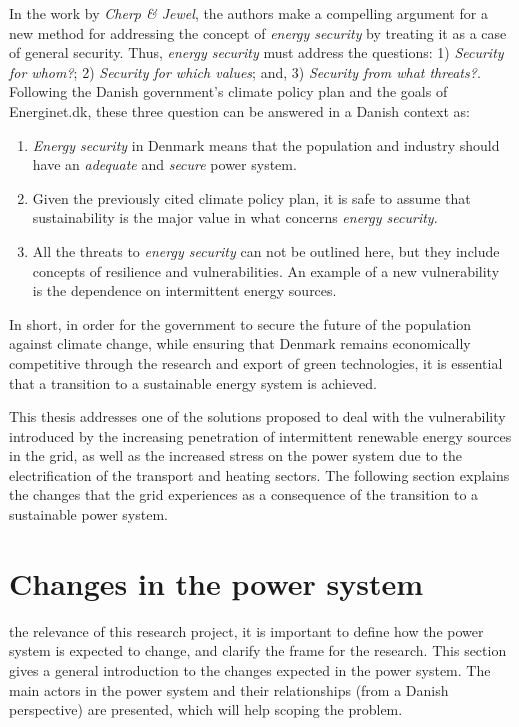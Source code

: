 In the work by \textit{Cherp \& Jewel}, the authors make a compelling argument for a new method for addressing the concept of \emph{energy security} by treating it as a case of general security. Thus, \emph{energy security} must address the questions: 1) \emph{Security for whom?}; 2) \emph{Security for which values}; and, 3) \emph{Security from what threats?}. Following the Danish government's climate policy plan and the goals of Energinet.dk, these three question can be answered in a Danish context as:
\begin{enumerate}
	\item \emph{Energy security} in Denmark means that the population and industry should have an \emph{adequate} and \emph{secure} power system.
	\item Given the previously cited climate policy plan, it is safe to assume that sustainability is the major value in what concerns \emph{energy security}.
	\item All the threats to \emph{energy security} can not be outlined here, but they include concepts of resilience and vulnerabilities. An example of a new vulnerability is the dependence on intermittent energy sources.
\end{enumerate}

In short, in order for the government to secure the future of the population against climate change, while ensuring that Denmark remains economically competitive through the research and export of green technologies, it is essential that a transition to a sustainable energy system is achieved. 

This thesis addresses one of the solutions proposed to deal with the vulnerability introduced by the increasing penetration of intermittent renewable energy sources in the grid, as well as the increased stress on the power system due to the electrification of the transport and heating sectors. The following section explains the changes that the grid experiences as a consequence of the transition to a sustainable power system.
\section{Changes in the power system}%
\label{sec:powsysdesc}
 the relevance of this research project, it is important to define how the power system is expected to change, and clarify the frame for the research. This section gives a general introduction %
 to the changes expected in the power system. The main actors in the power system and their relationships (from a Danish perspective) are presented, which will help scoping the problem.%
